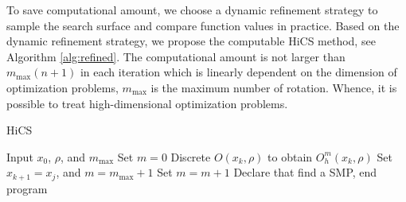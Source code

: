 \documentclass[final,1p,times]{elsarticle}
\begin{document}
To save computational amount, we choose a dynamic
refinement strategy to sample the search surface and compare
function values in practice. 
Based on the dynamic refinement strategy, we propose the
computable HiCS
method, see Algorithm \ref{alg:refined}. The computational amount is not
larger than $m_{\max}(n+1)$ in each iteration which is linearly
dependent on the dimension of optimization problems,
$m_{\max}$ is the maximum number of rotation.
Whence, it is possible to treat high-dimensional optimization problems.

\begin{algorithm}[H]
	\caption{HiCS}
	\label{alg:refined}
\begin{algorithmic}[1]
	\STATE Input $x_0$, $\rho$, and $m_{\max}$
		\STATE Set $m=0$
			\STATE Discrete $O(x_k,\rho)$ to obtain $O^m_h(x_k,\rho)$
				\STATE Set $x_{k+1}=x_j$, and $m=m_{\max}+1$
			\ELSE
				\STATE Set $m = m+1$
			\ENDIF
		\ELSE
			\STATE Declare that find a SMP, end program
		\ENDIF
	\ENDFOR
\end{algorithmic}
\end{algorithm}

\end{document}
